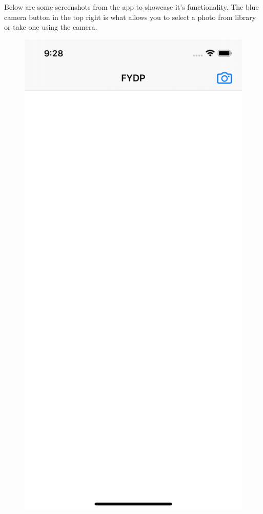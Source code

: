 \documentclass[a4paper,11pt]{article}
\begin{document}
\noindent
Below are some screenshots from the app to showcase it's functionality. The blue camera button in the top right is what allows you to select a photo from library or take one using the camera.
\begin{figure}[H]
    \centering
    \includegraphics[width={0.3\linewidth}]{img/ios_test_app/testapp_home.png}

\end{figure}
\end{document}
